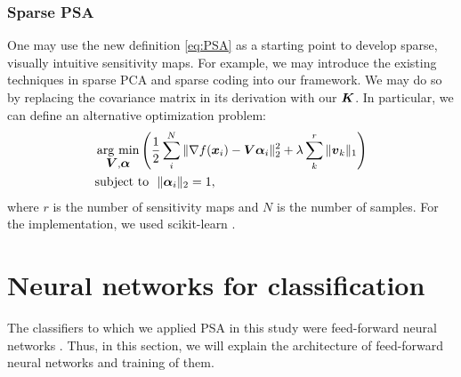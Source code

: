 \subsubsection{Sparse PSA}
%
One may use the new definition \eqref{eq:PSA} as a starting
point to develop sparse, visually intuitive sensitivity maps.
%
For example, we may introduce the existing techniques in sparse PCA and
sparse coding into our framework.
%
We may do so \cite{Jenatton2009} by replacing the covariance matrix in
its derivation with our $\mbox{\boldmath $K$}$.
In particular, we can define an alternative optimization problem:
%
\begin{align}
\begin{split}
 \begin{aligned}
& \mathop{\rm arg~min}\limits_{\mbox{\boldmath $V$}, \mbox{\boldmath $\alpha$}} \left(\frac{1}{2} \sum_{i}^{N} \| \nabla f(\mbox{\boldmath $x$}_i)
  - \mbox{\boldmath $V$} \mbox{\boldmath $\alpha$}_i \|_2^2 + \lambda \sum_{k}^{r} \|\mbox{\boldmath $v$}_k\|_1 \right) \\
& \text{subject to}\,\,\,\,\|\mbox{\boldmath $\alpha$}_i\|_2 = 1,
 \end{aligned}
\end{split}
\label{eq:sparsePSA}
\end{align}
%
where $r$ is the number of sensitivity maps and $N$ is the number of samples.
For the implementation, we used scikit-learn \cite{Pedregosa2012}.

\clearpage
\section{Neural networks for classification}
\label{sec:NN}
%
The classifiers to which we applied PSA in this study were feed-forward
neural networks \cite{bishop2006pattern}.
Thus, in this section, we will explain the architecture of feed-forward neural
networks and training of them.

